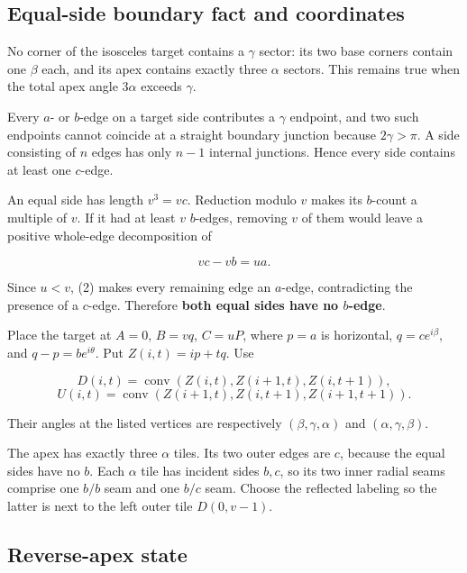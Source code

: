 \documentclass[
  11pt,
  a4paper,
]{article}
\begin{document}
\hypertarget{equal-side-boundary-fact-and-coordinates}{%
\subsection{Equal-side boundary fact and
coordinates}\label{equal-side-boundary-fact-and-coordinates}}

No corner of the isosceles target contains a \(\gamma\) sector: its two
base corners contain one \(\beta\) each, and its apex contains exactly
three \(\alpha\) sectors. This remains true when the total apex angle
\(3\alpha\) exceeds \(\gamma\).

Every \(a\)- or \(b\)-edge on a target side contributes a \(\gamma\)
endpoint, and two such endpoints cannot coincide at a straight boundary
junction because \(2\gamma>\pi\). A side consisting of \(n\) edges has
only \(n-1\) internal junctions. Hence every side contains at least one
\(c\)-edge.

An equal side has length \(v^3=vc\). Reduction modulo \(v\) makes its
\(b\)-count a multiple of \(v\). If it had at least \(v\) \(b\)-edges,
removing \(v\) of them would leave a positive whole-edge decomposition
of

\[
vc-vb=u a.
\]

Since \(u<v\), (2) makes every remaining edge an \(a\)-edge,
contradicting the presence of a \(c\)-edge. Therefore \textbf{both equal
sides have no \(b\)-edge}.

Place the target at \(A=0\), \(B=vq\), \(C=uP\), where \(p=a\) is
horizontal, \(q=ce^{i\beta}\), and \(q-p=be^{i\theta}\). Put
\(Z(i,t)=ip+tq\). Use

\[
D(i,t)=\operatorname{conv}(Z(i,t),Z(i+1,t),Z(i,t+1)),
\] \[
U(i,t)=\operatorname{conv}(Z(i+1,t),Z(i,t+1),Z(i+1,t+1)).
\]

Their angles at the listed vertices are respectively
\((\beta,\gamma,\alpha)\) and \((\alpha,\gamma,\beta)\).

The apex has exactly three \(\alpha\) tiles. Its two outer edges are
\(c\), because the equal sides have no \(b\). Each \(\alpha\) tile has
incident sides \(b,c\), so its two inner radial seams comprise one
\(b/b\) seam and one \(b/c\) seam. Choose the reflected labeling so the
latter is next to the left outer tile \(D(0,v-1)\).

\hypertarget{reverse-apex-state}{%
\subsection{Reverse-apex state}\label{reverse-apex-state}}
\end{document}
